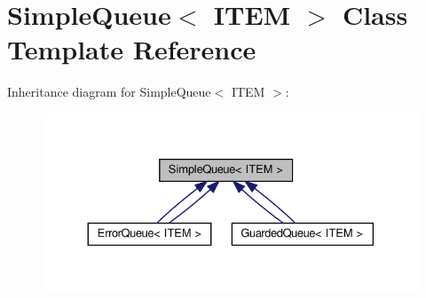 \hypertarget{classSimpleQueue}{}\section{Simple\+Queue$<$ I\+T\+EM $>$ Class Template Reference}
\label{classSimpleQueue}


Inheritance diagram for Simple\+Queue$<$ I\+T\+EM $>$\+:\nopagebreak
\begin{figure}[H]
\begin{center}
\leavevmode
\includegraphics[width=330pt]{classSimpleQueue__inherit__graph}
\end{center}
\end{figure}
